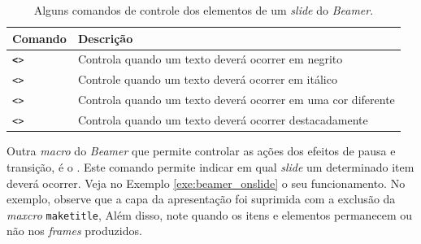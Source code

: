 \begin{table}[H]
\centering
\caption{Alguns comandos de controle dos elementos de um \textit{slide} do \textit{Beamer}.}
\label{tab:beamer1}
    \begin{tabular}{p{2.5cm}p{8.5cm}}
    \toprule
    \textbf{Comando} & \textbf{Descrição} \\
    \midrule
    \texttt{\textbf<>{}} & Controla quando um texto deverá ocorrer em negrito \\
    \texttt{\textit<>{}} & Controle quando um texto deverá ocorrer em itálico \\
    \texttt{\color<>{}} & Controla quando um texto deverá ocorrer em uma cor diferente \\
    \texttt{\alert<>{}} & Controla quando um texto deverá ocorrer destacadamente \\
    \bottomrule
    \end{tabular}
\end{table}

Outra \textit{macro} do \textit{Beamer} que permite controlar as ações dos efeitos de pausa e transição, é o \texttt{\onslide}. Este comando permite indicar em qual \textit{slide} um determinado item deverá ocorrer. Veja no Exemplo \ref{exe:beamer_onslide} o seu funcionamento. No exemplo, observe que a capa da apresentação foi suprimida com a exclusão da \textit{maxcro} {\tt maketitle}, Além disso, note quando os itens e elementos permanecem ou não nos \textit{frames} produzidos.


